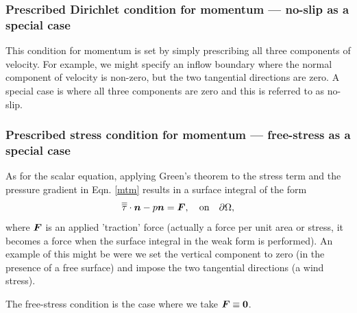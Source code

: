 
\subsubsection{Prescribed Dirichlet condition for momentum --- no-slip as a special case}\label{sect:bc_vector_dirichlet}
This condition for momentum is set by simply prescribing all three components of velocity. For example, we might specify an inflow boundary where the normal component of velocity is non-zero, but the two tangential directions are zero. A special case is where all three components are zero and this is referred to as no-slip.


\subsubsection{Prescribed stress condition for momentum --- free-stress as a special case}\label{sect:bc_scalar_stress}
As for the scalar equation, applying Green's theorem to the stress term and the pressure gradient in Eqn. \ref{mtm} results in a surface integral of the form
\begin{equation}\label{StressBC}
\overline{\overline{\tau}}\cdot{\mbox{\boldmath$n$}} - p{\mbox{\boldmath$n$}} = {\mbox{\boldmath$F$}},\quad \textrm{on}\quad \partial\Omega,
\end{equation}
where ${\mbox{\boldmath$F$}}$ is an applied 'traction' force (actually a force per unit area or stress, it becomes a force when the surface integral in the weak form is performed). An example of this might be were we set the vertical component to zero (in the presence of a free surface) and impose the two tangential directions (\eg a wind stress).

The free-stress condition is the case where we take ${\mbox{\boldmath$F$}}\equiv{\mbox{\boldmath$0$}}$.


